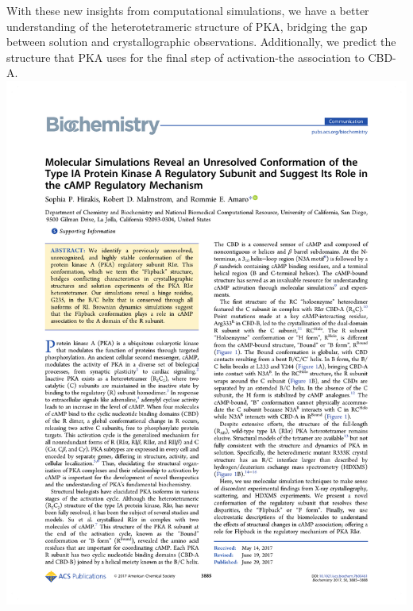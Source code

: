 \documentclass[12pt]{ucsddissertation}
\begin{document}
With these new insights from computational simulations, we have a better understanding of the heterotetrameric structure of PKA, bridging the gap between solution and crystallographic observations. Additionally, we predict the structure that PKA uses for the final step of activation-the association to CBD-A.   \\
\includegraphics[height=0.9\textheight]{Flipback_Paper_Chapter3.pdf}

\end{document}
